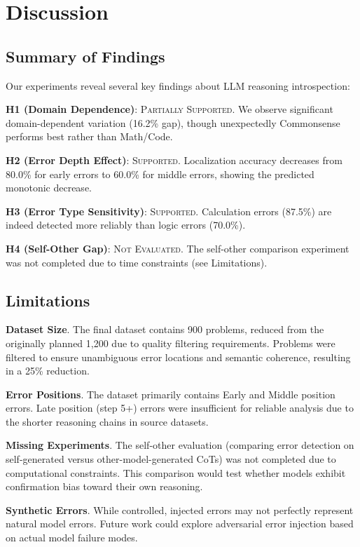 \documentclass{article}
\begin{document}
\section{Discussion}

\subsection{Summary of Findings}

Our experiments reveal several key findings about LLM reasoning introspection:

\textbf{H1 (Domain Dependence)}: \textsc{Partially Supported}. We observe significant domain-dependent variation (16.2\% gap), though unexpectedly Commonsense performs best rather than Math/Code.

\textbf{H2 (Error Depth Effect)}: \textsc{Supported}. Localization accuracy decreases from 80.0\% for early errors to 60.0\% for middle errors, showing the predicted monotonic decrease.

\textbf{H3 (Error Type Sensitivity)}: \textsc{Supported}. Calculation errors (87.5\%) are indeed detected more reliably than logic errors (70.0\%).

\textbf{H4 (Self-Other Gap)}: \textsc{Not Evaluated}. The self-other comparison experiment was not completed due to time constraints (see Limitations).

\subsection{Limitations}

\textbf{Dataset Size}. The final dataset contains 900 problems, reduced from the originally planned 1,200 due to quality filtering requirements. Problems were filtered to ensure unambiguous error locations and semantic coherence, resulting in a 25\% reduction.

\textbf{Error Positions}. The dataset primarily contains Early and Middle position errors. Late position (step 5+) errors were insufficient for reliable analysis due to the shorter reasoning chains in source datasets.

\textbf{Missing Experiments}. The self-other evaluation (comparing error detection on self-generated versus other-model-generated CoTs) was not completed due to computational constraints. This comparison would test whether models exhibit confirmation bias toward their own reasoning.

\textbf{Synthetic Errors}. While controlled, injected errors may not perfectly represent natural model errors. Future work could explore adversarial error injection based on actual model failure modes.
\end{document}
